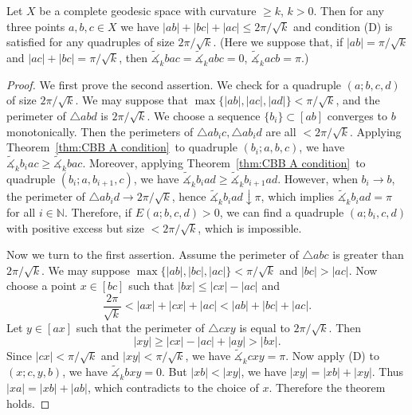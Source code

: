 \begin{thm}
    Let $X$ be a complete geodesic space with curvature $\geq k$, $k>0$.
    Then for any three points $a,b,c\in X$ we have $|ab|+|bc|+|ac|\leq 2\pi/\sqrt{k}$ and condition {\rm (D)} is satisfied for any quadruples of size $2\pi/\sqrt{k}$.
    (Here we suppose that, if $|ab|=\pi/\sqrt{k}$ and $|ac|+|bc|=\pi/\sqrt{k}$, then $\tilde{\measuredangle}_kbac=\tilde{\measuredangle}_kabc=0$, $\tilde{\measuredangle}_kacb=\pi$.)
\end{thm}
\begin{proof}
    We first prove the second assertion.
    We check for a quadruple $(a;b,c,d)$ of size $2\pi/\sqrt{k}$.
    We may suppose that $\max\{|ab|,|ac|,|ad|\}<\pi/\sqrt{k}$, and the perimeter of $\triangle{abd}$ is $2\pi/\sqrt{k}$.
    We choose a sequence $\{b_i\}\subset[ab]$ converges to $b$ monotonically.
    Then the perimeters of $\triangle{ab_ic},\triangle{ab_id}$ are all $<2\pi/\sqrt{k}$.
    Applying Theorem~\ref{thm:CBB A condition}~to quadruple $(b_i;a,b,c)$, we have $\tilde{\measuredangle}_kb_iac\geq\tilde{\measuredangle}_kbac$.
    Moreover, applying Theorem~\ref{thm:CBB A condition}~to quadruple $(b_i;a,b_{i+1},c)$, we have $\tilde{\measuredangle}_kb_iad\geq\tilde{\measuredangle}_kb_{i+1}ad$.
    However, when $b_i\to b$, the perimeter of $\triangle{ab_id}\to 2\pi/\sqrt{k}$, hence $\tilde{\measuredangle}_kb_iad\downarrow\pi$, which implies $\tilde{\measuredangle}_kb_iad=\pi$ for all $i\in\mathbb{N}$.
    Therefore, if $E(a;b,c,d)>0$, we can find a quadruple $(a;b_i,c,d)$ with positive excess but size $<2\pi/\sqrt{k}$, which is impossible.

    Now we turn to the first assertion.
    Assume the perimeter of $\triangle{abc}$ is greater than $2\pi/\sqrt{k}$.
    We may suppose $\max\{|ab|,|bc|,|ac|\}<\pi/\sqrt{k}$ and $|bc|>|ac|$.
    Now choose a point $x\in[bc]$ such that $|bx|\leq|cx|-|ac|$ and
    \[\frac{2\pi}{\sqrt{k}}<|ax|+|cx|+|ac|<|ab|+|bc|+|ac|.\]
    Let $y\in[ax]$ such that the perimeter of $\triangle{cxy}$ is equal to $2\pi/\sqrt{k}$.
    Then
    \[|xy|\geq|cx|-|ac|+|ay|>|bx|.\]
    Since $|cx|<\pi/\sqrt{k}$ and $|xy|<\pi/\sqrt{k}$, we have $\tilde{\measuredangle}_kcxy=\pi$.
    Now apply (D) to $(x;c,y,b)$, we have $\tilde{\measuredangle}_kbxy=0$.
    But $|xb|<|xy|$, we have $|xy|=|xb|+|xy|$.
    Thus $|xa|=|xb|+|ab|$, which contradicts to the choice of $x$.
    Therefore the theorem holds.
\end{proof}